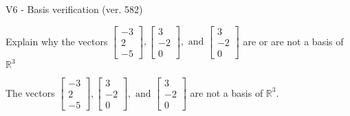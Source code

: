 \begin{exercise}
  \begin{exerciseTitle}V6 - Basis verification (ver. 582)\end{exerciseTitle}
  \begin{exerciseStatement}
    Explain why the vectors \(\left[\begin{array}{r}
-3 \\
2 \\
-5
\end{array}\right] , \left[\begin{array}{r}
3 \\
-2 \\
0
\end{array}\right] , \text{ and } \left[\begin{array}{r}
3 \\
-2 \\
0
\end{array}\right]\) are or are not a basis of \(\mathbb{R}^3\)	


  \end{exerciseStatement}
  \begin{exerciseAnswer}
   The vectors \(\left[\begin{array}{r}
-3 \\
2 \\
-5
\end{array}\right] , \left[\begin{array}{r}
3 \\
-2 \\
0
\end{array}\right] , \text{ and } \left[\begin{array}{r}
3 \\
-2 \\
0
\end{array}\right]\) 
  	 are not  a basis of \(\mathbb{R}^3\).
  


  \end{exerciseAnswer}
\end{exercise}